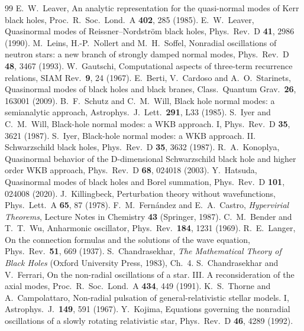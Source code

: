 \documentclass[11pt,a4paper]{article}
\numberwithin{equation}{section}
\begin{document}
\begin{thebibliography}{99}
 E.~W.~Leaver, An analytic representation for the quasi-normal modes of Kerr black holes, Proc.\ R.\ Soc.\ Lond.\ A \textbf{402}, 285 (1985).
 E.~W.~Leaver, Quasinormal modes of Reissner--Nordstr\"om black holes, Phys.\ Rev.\ D \textbf{41}, 2986 (1990).
 M.~Leins, H.-P.~Nollert and M.~H.~Soffel, Nonradial oscillations of neutron stars: a new branch of strongly damped normal modes, Phys.\ Rev.\ D \textbf{48}, 3467 (1993).
 W.~Gautschi, Computational aspects of three-term recurrence relations, SIAM Rev.\ \textbf{9}, 24 (1967).
 E.~Berti, V.~Cardoso and A.~O.~Starinets, Quasinormal modes of black holes and black branes, Class.\ Quantum Grav.\ \textbf{26}, 163001 (2009).
 B.~F.~Schutz and C.~M.~Will, Black hole normal modes: a semianalytic approach, Astrophys.\ J.\ Lett.\ \textbf{291}, L33 (1985).
 S.~Iyer and C.~M.~Will, Black-hole normal modes: a WKB approach. I, Phys.\ Rev.\ D \textbf{35}, 3621 (1987).
 S.~Iyer, Black-hole normal modes: a WKB approach. II. Schwarzschild black holes, Phys.\ Rev.\ D \textbf{35}, 3632 (1987).
 R.~A.~Konoplya, Quasinormal behavior of the D-dimensional Schwarzschild black hole and higher order WKB approach, Phys.\ Rev.\ D \textbf{68}, 024018 (2003).
 Y.~Hatsuda, Quasinormal modes of black holes and Borel summation, Phys.\ Rev.\ D \textbf{101}, 024008 (2020).
 J.~Killingbeck, Perturbation theory without wavefunctions, Phys.\ Lett.\ A \textbf{65}, 87 (1978).
 F.~M.~Fern\'andez and E.~A.~Castro, \emph{Hypervirial Theorems}, Lecture Notes in Chemistry \textbf{43} (Springer, 1987).
 C.~M.~Bender and T.~T.~Wu, Anharmonic oscillator, Phys.\ Rev.\ \textbf{184}, 1231 (1969).
 R.~E.~Langer, On the connection formulas and the solutions of the wave equation, Phys.\ Rev.\ \textbf{51}, 669 (1937).
 S.~Chandrasekhar, \emph{The Mathematical Theory of Black Holes} (Oxford University Press, 1983), Ch.~4.
 S.~Chandrasekhar and V.~Ferrari, On the non-radial oscillations of a star. III. A reconsideration of the axial modes, Proc.\ R.\ Soc.\ Lond.\ A \textbf{434}, 449 (1991).
 K.~S.~Thorne and A.~Campolattaro, Non-radial pulsation of general-relativistic stellar models. I, Astrophys.\ J.\ \textbf{149}, 591 (1967).
 Y.~Kojima, Equations governing the nonradial oscillations of a slowly rotating relativistic star, Phys.\ Rev.\ D \textbf{46}, 4289 (1992).

\end{thebibliography}
\end{document}
